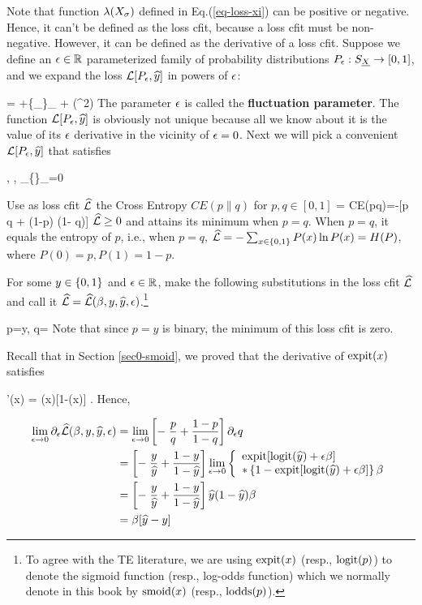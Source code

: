 Note that function $\lambda(X_\sigma)$ defined in Eq.(\ref{eq-loss-xi})
can be positive or negative. Hence,
 it can't be defined as the loss cfit,
because a loss cfit must be non-negative. However, it can be
defined as the derivative of a loss cfit. Suppose we define an $\epsilon\in{ \mathbb{R}}$
parameterized
family of probability distributions $P_\epsilon:S_{\underline{X}}\rightarrow [0,1]$,
and we expand the loss ${\cal L}[P_\epsilon, {\widehat{y}}]$
in powers of $\epsilon$:

\beq
{} = \call[P_0, \haty]
+\eps \{\partial_\eps {}\}_{} + \calo(\eps^2)
\eeq
The parameter $\epsilon$ is called the {\bf fluctuation parameter}.
The function ${\cal L}[P_\epsilon, {\widehat{y}}]$ is obviously
not unique because all we know about it
is the value of its $\epsilon$ derivative
in the vicinity of $\epsilon=0$. Next we will pick a convenient
${\cal L}[P_\epsilon, {\widehat{y}}]$ that satisfies

\beq
{},\quad
{}, \quad \partial_\eps \{\}_{}=0
\eeq


Use as loss cfit $\widehat{{\cal L}}$ the Cross Entropy
$CE(p\parallel q)$ for $p, q\in [0,1]$
\beq
\hatl = CE(p\parallel q)=-[p \ln q + (1-p) \ln(1- q)]
\eeq
$\widehat{{\cal L}}\geq 0$ and attains its minimum when $p=q$.
When $p=q$, it equals the entropy of $p$,
i.e., when $p=q$, $\widehat{{\cal L}}=-\sum_{x\in \{0,1\}} P(x)\ln P(x)= H(P)$,
where $P(0)=p, P(1)=1-p$.

For some $y\in\{0,1\}$ and $\epsilon\in{ \mathbb{R}}$,
make the following
substitutions
in the loss cfit $\widehat{{\cal L}}$
and call it $\widehat{{\cal L}}=\widehat{{\cal L}}(\beta, y, {\widehat{y}}, \epsilon)$.\footnote{To
agree with the TE literature,
we are using ${\rm expit}(x)$
(resp., ${\rm logit}(p)$) to denote
the sigmoid function (resp., log-odds function)
which we normally
denote in this book by
 ${\rm smoid}(x)$ (resp., ${\rm lodds}(p)$).}

\beq
p=y,
\quad
q= \expit[\logit(\haty) + \eps \beta ]
\eeq
Note that since $p=y$ is binary,
the minimum of this loss cfit is zero.


 Recall that in Section \ref{sec0-smoid}, we proved that
 the derivative of ${\rm expit}(x)$ satisfies

\beq
\expit'(x) = \expit(x)[1-\expit(x)]
\;.
\eeq
Hence,

\begin{align}
\lim_{\epsilon\rightarrow 0}\partial_\epsilon \widehat{{\cal L}}(\beta, y, {\widehat{y}}, \epsilon)
&=
\lim_{\epsilon\rightarrow 0}
\left[-\;\frac{p}{q} + \frac{1-p}{1-q}\right]\partial_\epsilon q
\\
&=
\left[-\;\frac{y}{{\widehat{y}}} + \frac{1-y}{1-{\widehat{y}}}\right]
\lim_{\epsilon\rightarrow 0}
\left\{
\begin{array}{l}
{\rm expit}[{\rm logit}({\widehat{y}}) + \epsilon \beta ]
\\
*\left\{1-{\rm expit}[{\rm logit}({\widehat{y}}) + \epsilon \beta ]\right\}
\beta
\end{array}
\right.
\\
&=
\left[-\;\frac{y}{{\widehat{y}}} + \frac{1-y}{1-{\widehat{y}}}\right]
{\widehat{y}}(1-{\widehat{y}})\beta
\\
&=
\beta[{\widehat{y}}-y]
\end{align}

